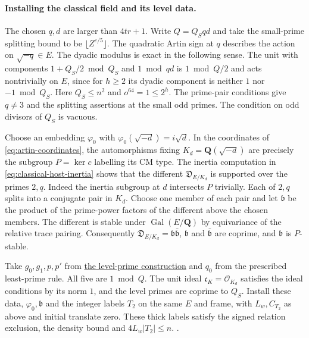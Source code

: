 \paragraph{Installing the classical field and its level data.}
%
The chosen \(q,d\) are larger than \(4tr+1\). Write
\(Q=Q_Sqd\) and take the small-prime splitting bound to be
\(\lfloor Z^{\varepsilon/5}\rfloor\). The quadratic Artin sign at
\(q\) describes the action on \(\sqrt{-q}\in E\). The dyadic modulus
is exact in the following sense. The unit with components
\(1+Q_S/2\bmod Q_S\) and \(1\bmod qd\) is \(1\bmod Q/2\) and
acts nontrivially on \(E\), since for \(h\ge2\) its dyadic component
is neither \(1\) nor \(-1\bmod Q_S\). Here \(Q_S\le n^2\) and
\(o^{64}=1\le2^h\). The prime-pair conditions give \(q\ne3\) and
the splitting assertions at the small odd primes. The condition
on odd divisors of \(Q_S\) is vacuous.

Choose an embedding \(\varphi_0\) with
\(\varphi_0(\sqrt{-d})=i\sqrt d\). In the coordinates of
\eqref{eq:artin-coordinates}, the automorphisms fixing
\(K_d=\mathbf Q(\sqrt{-d})\) are precisely the subgroup
\(P=\ker c\) labelling its CM type. The inertia computation in
\eqref{eq:classical-host-inertia} shows that the different
\(\mathfrak D_{E/K_d}\) is supported over the primes \(2,q\).
Indeed the inertia subgroup at \(d\) intersects \(P\) trivially.
Each of \(2,q\) splits into a conjugate pair in \(K_d\). Choose
one member of each pair and let \(\mathfrak b\) be the product of
the prime-power factors of the different above the chosen members.
The different is stable under \(\operatorname{Gal}(E/\mathbf Q)\)
by equivariance of the relative trace pairing. Consequently
\(\mathfrak D_{E/K_d}=\mathfrak b\bar{\mathfrak b}\),
\(\mathfrak b\) and \(\bar{\mathfrak b}\) are coprime, and
\(\mathfrak b\) is \(P\)-stable.

Take \(g_0,g_1,p,p'\) from
\hyperlink{proof.level-primes-short-intervals}{the level-prime construction}
and \(q_0\) from the prescribed least-prime rule. All five are
\(1\bmod Q\). The unit ideal \(\mathfrak c_K=\mathcal O_{K_d}\)
satisfies the ideal conditions by its norm \(1\), and the level
primes are coprime to \(Q_S\). Install these data,
\(\varphi_0,\mathfrak b\) and the integer labels \(T_2\) on the same
\(E\) and frame, with \(L_w,C_{T_2}\) as above and initial translate
zero. These thick labels satisfy the signed relation exclusion,
the density bound and \(4L_w|T_2|\le n\).
.

